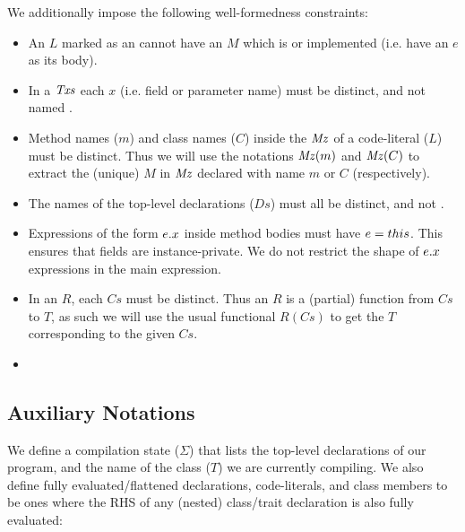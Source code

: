 We additionally impose the following well-formedness constraints:
\begin{itemize}
	\item An $L$ marked as an  cannot have an $M$ which is  or implemented (i.e. have an $e$ as its body).
	
	\item In a $\mathit{Txs}$ each $x$ (i.e. field or parameter name) must be distinct, and not named . 
	
	\item Method names ($m$) and class names ($C$) inside the $\mathit{Mz}$ of a code-literal ($L$) must be distinct. Thus we will use the notations $\mathit{Mz}(m)$ and $\mathit{Mz}(C)$ to extract the (unique) $M$ in $\mathit{Mz}$ declared with name $m$ or $C$ (respectively).
	
	\item The names of the top-level declarations ($Ds$) must all be distinct, and not \This.

	\item Expressions of the form $\ef{e}{x}$ inside method bodies must have $e = \Q{this}$. This ensures that fields are instance-private. We do not restrict the shape of $\ef{e}{x}$ expressions in the main expression. 
	
	\item In an $R$, each $Cs$ must be distinct. Thus an $R$ is a (partial) function from $Cs$ to $T$, as such we will use the usual functional $R(Cs)$ to get the $T$ corresponding to the given $Cs$. 
	\item {}
\end{itemize}


\subsection{Auxiliary Notations}
We define a compilation state ($\Sigma$) that lists the top-level declarations of our program, and the name of the class ($T$) we are currently compiling. We also define fully evaluated/flattened declarations, code-literals, and class members to be ones where the RHS of any (nested) class/trait declaration is also fully evaluated:

\begin{grammar}
	\midrule
\end{grammar}



